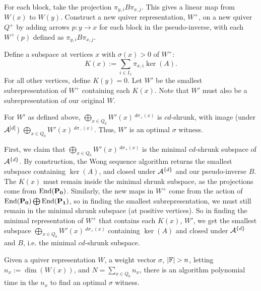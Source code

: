 For each block, take the projection $\pi_{y,i} B \pi_{x,j}$. This gives a linear map from $W(x)$ to $W(y)$. Construct a new quiver representation, $W^{+}$, on a new quiver $Q^{+}$ by adding arrows $p:y\rightarrow x$ for each block in the pseudo-inverse, with each $W^{+}(p)$ defined as $\pi_{y,i} B \pi_{x,j}$. 

Define a subspace at vertices $x$ with $\sigma(x)>0$ of $W^{+}$: 
$$K(x):=\sum_{i\in I_{x}} \pi_{x,i}\ker(A).$$
For all other vertices, define $K(y)=0.$ Let $W'$ be the smallest subrepresentation of $W^{+}$ containing each $K(x)$. Note that $W'$ must also be a subrepresentation of our original $W$. 

\begin{proposition}
For $W'$ as defined above, $\bigoplus_{x\in Q_0} W'(x)\,^{d\sigma_+(x)}$ is $cd$-shrunk, with image (under $\mathcal{A}^{[d]}$) $\bigoplus_{x\in Q_0} W'(x)\,^{d\sigma_-(x)}$. Thus, $W'$ is an optimal $\sigma$ witness.
\end{proposition}

First, we claim that $\bigoplus_{x\in Q_0} W'(x)\,^{d\sigma_+(x)}$ is the minimal $cd$-shrunk subspace of $\mathcal{A}^{\{d\}}$. By construction, the Wong sequence algorithm returns the smallest subspace containing $\ker(A)$, and closed under $\mathcal{A}^{\{d\}}$ and our pseudo-inverse $B$. The $K(x)$ must remain inside the minimal shrunk subspace, as the projections come from $\operatorname{End}(\mathbf{P_0})$. Similarly, the new maps in $W^{+}$ come from the action of $\operatorname{End}(\mathbf{P_0})\bigoplus\operatorname{End}(\mathbf{P_1})$, so in finding the smallest subrepresentation, we must still remain in the minimal shrunk subspace (at positive vertices). So in finding the minimal representation of $W^+$ that contains each $K(x)$, $W'$, we get the smallest subspace $\bigoplus_{x\in Q_0} W'(x)\,^{d\sigma_+(x)}$ containing $\ker(A)$ and closed under $\mathcal{A}^{\{d\}}$ and $B$, i.e. the minimal $cd$-shrunk subspace. 

\begin{proposition}
Given a quiver representation $W$, a weight vector $\sigma$, $|\F|>n$, letting $n_x:=\dim(W(x))$, and $N=\sum_{x\in Q_0} n_x$, there is an algorithm polynomial time in the $n_x$ to find an optimal $\sigma$ witness.
\end{proposition}

